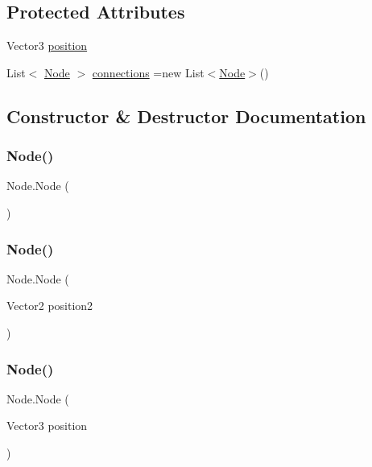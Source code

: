 \subsection*{Protected Attributes}
\begin{DoxyCompactItemize}
\item 
Vector3 \mbox{\hyperlink{class_node_a315059cd3874b8ca61426a4e1bd097a7}{position}}
\item 
List$<$ \mbox{\hyperlink{class_node}{Node}} $>$ \mbox{\hyperlink{class_node_a1d236f5a6dd9111a6ed9f2ebbdea57ac}{connections}} =new List$<$\mbox{\hyperlink{class_node}{Node}}$>$()
\end{DoxyCompactItemize}


\subsection{Constructor \& Destructor Documentation}
\mbox{\label{class_node_a989164b636cfeff98b4df9833976f4f5}} 
\subsubsection{\texorpdfstring{Node()}{Node()}\hspace{0.1cm}{\footnotesize\ttfamily [1/3]}}
{\footnotesize\ttfamily Node.\+Node (\begin{DoxyParamCaption}{ }\end{DoxyParamCaption})}

\mbox{\label{class_node_a653c96cdaab99419a8c1d8d80be10b80}} 
\subsubsection{\texorpdfstring{Node()}{Node()}\hspace{0.1cm}{\footnotesize\ttfamily [2/3]}}
{\footnotesize\ttfamily Node.\+Node (\begin{DoxyParamCaption}\item[{Vector2}]{position2 }\end{DoxyParamCaption})}

\mbox{\label{class_node_a188e8794e019e1dd2fcfa84af795c06d}} 
\subsubsection{\texorpdfstring{Node()}{Node()}\hspace{0.1cm}{\footnotesize\ttfamily [3/3]}}
{\footnotesize\ttfamily Node.\+Node (\begin{DoxyParamCaption}\item[{Vector3}]{position }\end{DoxyParamCaption})}




